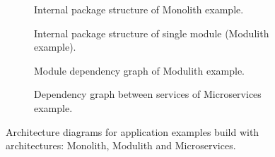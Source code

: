 \begin{figure}
    \centering
    \begin{subfigure}{.5\textwidth}
        \centering
        
        \caption{Internal package structure of Monolith example. \label{img:monolith_package}}
    \end{subfigure}%
    \begin{subfigure}{.5\textwidth}
        \centering
        
        \caption{Internal package structure of single module (Modulith example).\label{img:modulith_module_package}}
    \end{subfigure}
    \begin{subfigure}{\textwidth}
        \centering
        
        \caption{Module dependency graph of Modulith example. \label{img:modulith_package}}
    \end{subfigure}%
    \hfill
    \begin{subfigure}{\textwidth}
        \centering
        
        \caption{Dependency graph between services of Microservices example. \label{img:microservices_dependency}}
    \end{subfigure}
    \caption{Architecture diagrams for application examples build with architectures: Monolith, Modulith and Microservices.}
\end{figure}



